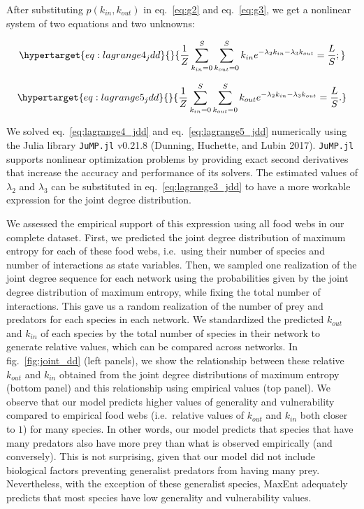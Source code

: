 \documentclass[10pt,oneside]{article}
\begin{document}
After substituting \(p(k_{in},k_{out})\) in eq.~\ref{eq:g2} and
eq.~\ref{eq:g3}, we get a nonlinear system of two equations and two
unknowns:

\begin{equation}\protect\hypertarget{eq:lagrange4_jdd}{}{\frac{1}{Z}\sum_{k_{in}=0}^S\sum_{k_{out}=0}^S k_{in} e^{-\lambda_2k_{in}-\lambda_3k_{out}}  = \frac{L}{S};}\label{eq:lagrange4_jdd}\end{equation}

\begin{equation}\protect\hypertarget{eq:lagrange5_jdd}{}{\frac{1}{Z}\sum_{k_{in}=0}^S\sum_{k_{out}=0}^S k_{out} e^{-\lambda_2k_{in}-\lambda_3k_{out}}  = \frac{L}{S}.}\label{eq:lagrange5_jdd}\end{equation}

We solved eq.~\ref{eq:lagrange4_jdd} and eq.~\ref{eq:lagrange5_jdd}
numerically using the Julia library \texttt{JuMP.jl} v0.21.8 (Dunning,
Huchette, and Lubin 2017). \texttt{JuMP.jl} supports nonlinear
optimization problems by providing exact second derivatives that
increase the accuracy and performance of its solvers. The estimated
values of \(\lambda_2\) and \(\lambda_3\) can be substituted in
eq.~\ref{eq:lagrange3_jdd} to have a more workable expression for the
joint degree distribution.

We assessed the empirical support of this expression using all food webs
in our complete dataset. First, we predicted the joint degree
distribution of maximum entropy for each of these food webs, i.e.~using
their number of species and number of interactions as state variables.
Then, we sampled one realization of the joint degree sequence for each
network using the probabilities given by the joint degree distribution
of maximum entropy, while fixing the total number of interactions. This
gave us a random realization of the number of prey and predators for
each species in each network. We standardized the predicted \(k_{out}\)
and \(k_{in}\) of each species by the total number of species in their
network to generate relative values, which can be compared across
networks. In fig.~\ref{fig:joint_dd} (left panels), we show the
relationship between these relative \(k_{out}\) and \(k_{in}\) obtained
from the joint degree distributions of maximum entropy (bottom panel)
and this relationship using empirical values (top panel). We observe
that our model predicts higher values of generality and vulnerability
compared to empirical food webs (i.e.~relative values of \(k_{out}\) and
\(k_{in}\) both closer to \(1\)) for many species. In other words, our
model predicts that species that have many predators also have more prey
than what is observed empirically (and conversely). This is not
surprising, given that our model did not include biological factors
preventing generalist predators from having many prey. Nevertheless,
with the exception of these generalist species, MaxEnt adequately
predicts that most species have low generality and vulnerability values.
\end{document}
